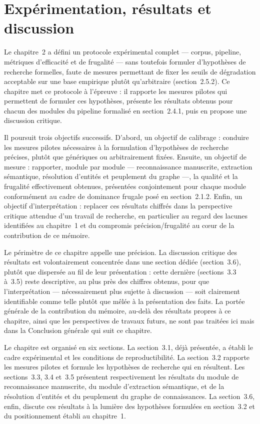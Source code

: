 \chapter{Expérimentation, résultats et discussion}
\label{chap:experimentations}

Le chapitre~2 a défini un protocole expérimental complet --- corpus, pipeline,
métriques d'efficacité et de frugalité --- sans toutefois formuler d'hypothèses
de recherche formelles, faute de mesures permettant de fixer les seuils de
dégradation acceptable sur une base empirique plutôt qu'arbitraire
(section~2.5.2). Ce chapitre met ce protocole à l'épreuve : il rapporte les
mesures pilotes qui permettent de formuler ces hypothèses, présente les résultats
obtenus pour chacun des modules du pipeline formalisé en section~2.4.1, puis en
propose une discussion critique.

Il poursuit trois objectifs successifs. D'abord, un objectif de calibrage :
conduire les mesures pilotes nécessaires à la formulation d'hypothèses de
recherche précises, plutôt que génériques ou arbitrairement fixées. Ensuite, un
objectif de mesure : rapporter, module par module --- reconnaissance manuscrite,
extraction sémantique, résolution d'entités et peuplement du graphe ---, la
qualité et la frugalité effectivement obtenues, présentées conjointement pour
chaque module conformément au cadre de dominance frugale posé en section~2.1.2.
Enfin, un objectif d'interprétation : replacer ces résultats chiffrés dans la
perspective critique attendue d'un travail de recherche, en particulier au regard
des lacunes identifiées au chapitre~1 et du compromis précision/frugalité au
cœur de la contribution de ce mémoire.

Le périmètre de ce chapitre appelle une précision. La discussion critique des
résultats est volontairement concentrée dans une section dédiée (section~3.6),
plutôt que dispersée au fil de leur présentation : cette dernière (sections~3.3
à~3.5) reste descriptive, au plus près des chiffres obtenus, pour que
l'interprétation --- nécessairement plus sujette à discussion --- soit clairement
identifiable comme telle plutôt que mêlée à la présentation des faits. La portée
générale de la contribution du mémoire, au-delà des résultats propres à ce
chapitre, ainsi que les perspectives de travaux futurs, ne sont pas traitées ici
mais dans la Conclusion générale qui suit ce chapitre.

Le chapitre est organisé en six sections. La section~3.1, déjà présentée, a établi
le cadre expérimental et les conditions de reproductibilité. La section~3.2
rapporte les mesures pilotes et formule les hypothèses de recherche qui en
résultent. Les sections~3.3, 3.4 et~3.5 présentent respectivement les résultats
du module de reconnaissance manuscrite, du module d'extraction sémantique, et de
la résolution d'entités et du peuplement du graphe de connaissances. La
section~3.6, enfin, discute ces résultats à la lumière des hypothèses formulées
en section~3.2 et du positionnement établi au chapitre~1.

